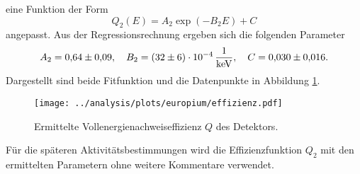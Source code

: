 eine Funktion der Form
\begin{equation*}
  Q_2(E)=A_2\exp\left(-B_2 E\right)+C
\end{equation*}
angepasst. Aus der Regressionsrechnung ergeben sich die folgenden Parameter
\begin{equation}
\label{eq:effizienz_Q_2}
A_2 = \num{0.64\pm0.09}, \quad B_2=\SI{32\pm6 e-4}{\per\kilo\eV}, \quad C = \num{0.030\pm0.016}.
\end{equation}
Dargestellt sind beide Fitfunktion und die Datenpunkte in Abbildung \ref{fig:effizienz}.
\begin{figure}
  \centering
  \texttt{[image: ../analysis/plots/europium/effizienz.pdf]}
  \caption{Ermittelte Vollenergienachweiseffizienz $Q$ des Detektors.}
  \label{fig:effizienz}
\end{figure}
Für die späteren Aktivitätsbestimmungen wird die Effizienzfunktion $Q_2$ mit den
ermittelten Parametern ohne weitere Kommentare verwendet.
\FloatBarrier

